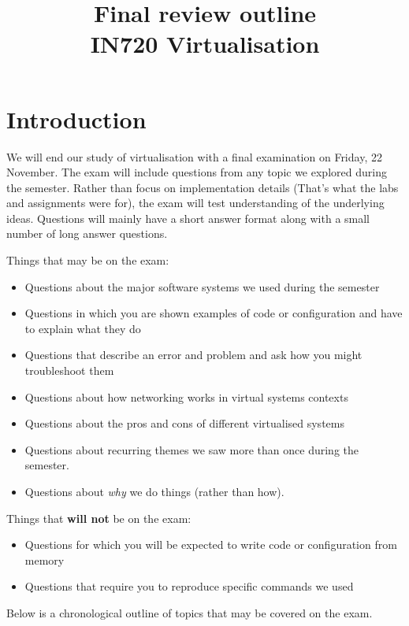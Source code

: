 \documentclass{article}
\begin{document}
\title{Final review outline\\IN720 Virtualisation}
\date{}
\maketitle

\section*{Introduction}
We will end our study of virtualisation with a final examination on Friday, 22 November. The exam will include questions from any topic we explored during the semester. Rather than focus on implementation details (That's what the labs and assignments were for), the exam will test understanding of the underlying ideas. Questions will mainly have a short answer format along with a small number of long answer questions.

Things that may be on the exam:
\begin{itemize}
  \item Questions about the major software systems we used during the semester
  \item Questions in which you are shown examples of code or configuration and have to explain what they do
  \item Questions that describe an error and problem and ask how you might troubleshoot them
  \item Questions about how networking works in virtual systems contexts
  \item Questions about the pros and cons of different virtualised systems
  \item Questions about recurring themes we saw more than once during the semester.
  \item Questions about \emph{why} we do things (rather than how).
\end{itemize}

Things that \textbf{will not} be on the exam:
\begin{itemize}
  \item Questions for which you will be expected to write code or configuration from memory
  \item Questions that require you to reproduce specific commands we used
\end{itemize}

Below is a chronological outline of topics that may be covered on the exam.
\end{document}
